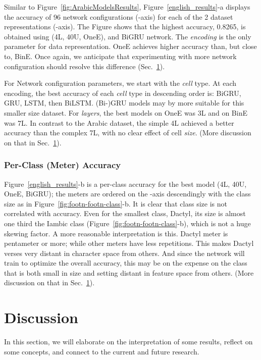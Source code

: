 \documentclass[journal,10pt,twocolumns,letter]{IEEEtran}
\begin{document}
Similar to Figure~\ref{fig:ArabicModelsResults}, Figure~\ref{english_results}-a displays the accuracy of 96 network configurations (-axis) for each of the 2 dataset representations
(-axis). The Figure shows that the highest accuracy, 0.8265, is obtained using (4L, 40U,
OneE), and BiGRU network. The \textit{encoding} is the only parameter for data representation. OneE
achieves higher accuracy than, but close to, BinE. Once again, we anticipate that experimenting
with more network configuration should resolve this difference (Sec.~\ref{sec:discussion}).

For Network configuration parameters, we start with the \textit{cell} type. At each encoding, the
best accuracy of each \textit{cell} type in descending order is: BiGRU, GRU, LSTM, then
BiLSTM\@. (Bi-)GRU models may by more suitable for this smaller size dataset. For \textit{layers},
the best models on OneE was 3L and on BinE was 7L. In contrast to the Arabic dataset, the simple 4L
achieved a better accuracy than the complex 7L, with no clear effect of cell \textit{size}. (More
discussion on that in Sec.~\ref{sec:discussion}).

\bigskip

\subsubsection{Per-Class (Meter) Accuracy}\label{sec:per-class-meter}
Figure~\ref{english_results}-b is a per-class accuracy for the best model (4L, 40U, OneE, BiGRU);
the meters are ordered on the -axis descendingly with the class size as in
Figure~\ref{fig:footn-footn-class}-b. It is clear that class size is not correlated with
accuracy. Even for the smallest class, Dactyl, its size is almost one third the Iambic class
(Figure~\ref{fig:footn-footn-class}-b), which is not a huge skewing factor. A more reasonable
interpretation is this. Dactyl meter is pentameter or more; while other meters have less
repetitions. This makes Dactyl verses very distant in character space from others. And since the
network will train to optimize the overall accuracy, this may be on the expense on the class that is
both small in size and setting distant in feature space from others. (More discussion on that in
Sec.~\ref{sec:discussion}).







\section{Discussion}\label{sec:discussion}
In this section, we will elaborate on the interpretation of some results, reflect on some concepts,
and connect to the current and future research.
\end{document}
